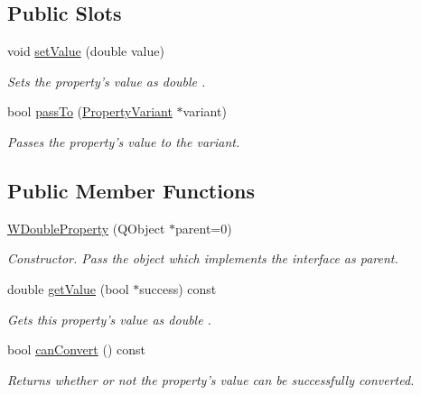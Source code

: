 \subsection*{Public Slots}
\begin{DoxyCompactItemize}
\item 
void \hyperlink{class_w_double_property_a710f9b1c3c4a12682e9fa257b832ae89}{set\-Value} (double value)
\begin{DoxyCompactList}\small\item\em Sets the property's value as double . \end{DoxyCompactList}\item 
bool \hyperlink{class_w_double_property_a11a0a8b257e291fe896848a772e0505b}{pass\-To} (\hyperlink{class_property_variant}{Property\-Variant} $\ast$variant)
\begin{DoxyCompactList}\small\item\em Passes the property's value to the variant. \end{DoxyCompactList}\end{DoxyCompactItemize}
\subsection*{Public Member Functions}
\begin{DoxyCompactItemize}
\item 
\hyperlink{class_w_double_property_a7af52228cc8bbd608ef0df519f079533}{W\-Double\-Property} (Q\-Object $\ast$parent=0)
\begin{DoxyCompactList}\small\item\em Constructor. Pass the object which implements the interface as parent. \end{DoxyCompactList}\item 
double \hyperlink{class_w_double_property_ac771c45522b2682056081700effc7930}{get\-Value} (bool $\ast$success) const 
\begin{DoxyCompactList}\small\item\em Gets this property's value as double . \end{DoxyCompactList}\item 
bool \hyperlink{class_w_double_property_acf72db76ced6c2dc50027bc2714be73b}{can\-Convert} () const 
\begin{DoxyCompactList}\small\item\em Returns whether or not the property's value can be successfully converted. \end{DoxyCompactList}\end{DoxyCompactItemize}
